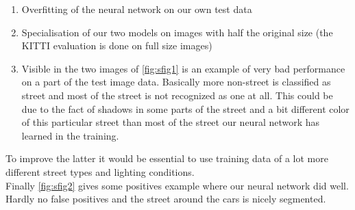 \begin{enumerate}
  \item Overfitting of the neural network on our own test data
  \item Specialisation of our two models on images with half the original size (the KITTI evaluation is done on full size images)
  \item Visible in the two images of \cref{fig:sfig1} is an example of very bad performance on a part of the test image data. Basically more non-street is classified as street and most of the street is not recognized as one at all. This could be due to the fact of shadows in some parts of the street and a bit different color of this particular street than most of the street our neural network has learned in the training.
  \end{enumerate}
To improve the latter it would be essential to use training data of a lot more different street types and lighting conditions.\\
Finally \cref{fig:sfig2} gives some positives example where our neural network did well. Hardly no false positives and the street around the cars is nicely segmented.
















%
